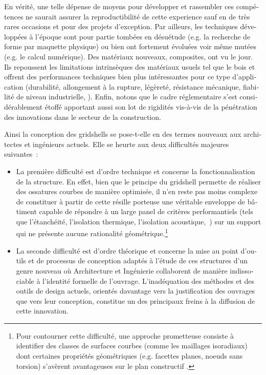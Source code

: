 \begin{otherlanguage}{french}
En vérité, une telle dépense de moyens pour développer et rassembler ces compétences ne saurait assurer la reproductibilité de cette experience sauf en de très rares occasions et pour des projets d'exception. Par ailleurs, les techniques développées à l'époque sont pour partie tombées en désuétude (e.g. la recherche de forme par maquette physique) ou bien ont fortement évoluées voir même mutées (e.g. le calcul numérique). Des matériaux nouveaux, composites, ont vu le jour. Ils repoussent les limitations intrinsèques des matériaux usuels tel que le bois et offrent des performances techniques bien plus intéressantes pour ce type d'application (durabilité, allongement à la rupture, légèreté, résistance mécanique, fiabilité de niveau industrielle, \telp{}). Enfin, notons que le cadre réglementaire s'est considérablement étoffé apportant aussi son lot de rigidités vis-à-vis de la pénétration des innovations dans le secteur de la construction.

Ainsi la conception des gridshells se pose-t-elle en des termes nouveaux aux architectes et ingénieurs actuels. Elle se heurte aux deux difficultés majeures suivantes~:
\begin{itemize}
\item
La première difficulté est d'ordre technique et concerne la fonctionnalisation de la structure. En effet, bien que le principe du gridshell permette de réaliser des ossatures courbes de manière optimisée, il n'en reste pas moins complexe de constituer à partir de cette résille porteuse une véritable enveloppe de bâtiment capable de répondre à un large panel de critères performantiels (tels que l'étanchéité, l'isolation thermique, l'isolation acoustique,~\telp{}) sur un support qui ne présente aucune rationalité géométrique.\footnote{Pour contourner cette difficulté, une approche prometteuse consiste à identifier des classes de surfaces courbes (comme les maillages isoradiaux) dont certaines propriétés géométriques (e.g. facettes planes, noeuds sans torsion) s'avèrent avantageuses sur le plan constructif \cite{Mesnil2017}.}
\item
La seconde difficulté est d'ordre théorique et concerne la mise au point d'outils et de processus de conception adaptés à l'étude de ces structures d'un genre nouveau où Architecture et Ingénierie collaborent de manière indissociable à l'identité formelle de l'ouvrage. L'inadéquation des méthodes et des outils de design actuels, orientés davantage vers la justification des ouvrages que vers leur conception, constitue un des principaux freins à la diffusion de cette innovation.
\end{itemize}


\end{otherlanguage}
